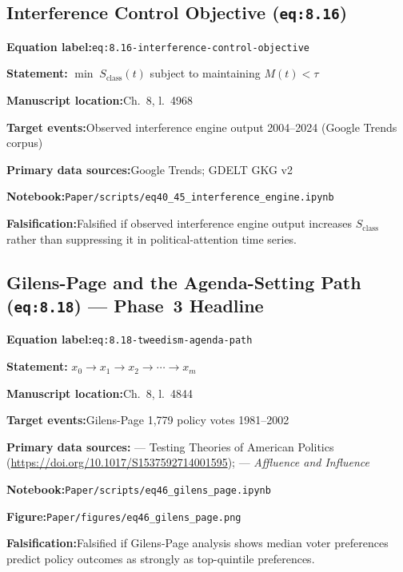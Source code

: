 \documentclass[12pt]{article}
\newcommand{\TierOne}{\textcolor{green!60!black}{\textbf{T1}}}
\newcommand{\caserow}[2]{%
  \noindent\textbf{#1:}\enspace #2\par\smallskip}
\begin{document}
\subsection{Interference Control Objective (\texttt{eq:8.16})}

\begin{tcolorbox}[caseblock, title={%
  \TierOne\quad Interference Control Objective}]

\caserow{Equation label}{\texttt{eq:8.16-interference-control-objective}}
\caserow{Statement}{%
  $\min\; S_{\text{class}}(t)$ subject to maintaining
  $M(t) < \tau$}
\caserow{Manuscript location}{Ch.~8, l.~4968}
\caserow{Target events}{Observed interference engine output
  2004--2024 (Google Trends corpus)}
\caserow{Primary data sources}{Google Trends; GDELT GKG v2}
\caserow{Notebook}{\texttt{Paper/scripts/eq40\_45\_interference\_engine.ipynb}}
\caserow{Falsification}{Falsified if observed interference engine
  output increases $S_{\text{class}}$ rather than suppressing it in
  political-attention time series.}

\end{tcolorbox}

\subsection{Gilens-Page and the Agenda-Setting Path (\texttt{eq:8.18})
  \texorpdfstring{---}{-} Phase~3 Headline}

\begin{tcolorbox}[caseblock, title={%
  \TierOne\quad Gilens-Page and the Agenda-Setting Path}]

\caserow{Equation label}{\texttt{eq:8.18-tweedism-agenda-path}}
\caserow{Statement}{%
  $x_0 \rightarrow x_1 \rightarrow x_2 \rightarrow \cdots \rightarrow
   x_m$}
\caserow{Manuscript location}{Ch.~8, l.~4844}
\caserow{Target events}{Gilens-Page 1,779 policy votes 1981--2002}
\caserow{Primary data sources}{%
  \textcite{gilens} --- Testing Theories of American Politics
  (\url{https://doi.org/10.1017/S1537592714001595});
  \textcite{gilens_book} --- \textit{Affluence and Influence}}
\caserow{Notebook}{\texttt{Paper/scripts/eq46\_gilens\_page.ipynb}}
\caserow{Figure}{\texttt{Paper/figures/eq46\_gilens\_page.png}}
\caserow{Falsification}{Falsified if Gilens-Page analysis shows median
  voter preferences predict policy outcomes as strongly as
  top-quintile preferences.}

\end{tcolorbox}
\end{document}
